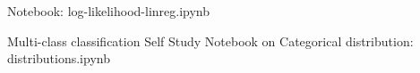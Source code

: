 \documentclass{beamer}
\begin{document}

\begin{frame}
    Notebook: log-likelihood-linreg.ipynb
\end{frame}

\begin{frame}{Multi-class classification}
    Self Study
    Notebook on Categorical distribution: distributions.ipynb
    
\end{frame}
\end{document}
